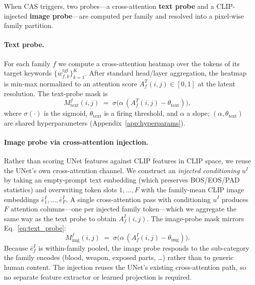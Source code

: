 When CAS triggers, two probes---a cross-attention \textbf{text probe} and a CLIP-injected \textbf{image probe}---are computed per family and resolved into a pixel-wise family partition.

\paragraph{Text probe.}
For each family $f$ we compute a cross-attention heatmap over the tokens of its target keywords $\{w^{\text{tgt}}_{f,k}\}_{k=1}^{K}$. After standard head/layer aggregation, the heatmap is min-max normalized to an attention score $A^{T}_f(i,j) \in [0,1]$ at the latent resolution. The text-probe mask is
\begin{equation}
    M^{f}_{\text{text}}(i,j) \;=\; \sigma\!\big(\alpha\,(A^{T}_f(i,j) - \theta_{\text{text}})\big),
    \label{eq:text_probe}
\end{equation}
where $\sigma(\cdot)$ is the sigmoid, $\theta_{\text{text}}$ is a firing threshold, and $\alpha$ a slope; $(\alpha, \theta_{\text{text}})$ are shared hyperparameters (Appendix~\ref{app:hyperparams}).

\paragraph{Image probe via cross-attention injection.}
Rather than scoring UNet features against CLIP features in CLIP space, we reuse the UNet's own cross-attention channel. We construct an \emph{injected conditioning} $u^{I}$ by taking an empty-prompt text embedding (which preserves BOS/EOS/PAD statistics) and overwriting token slots $1, \dots, F$ with the family-mean CLIP image embeddings $\bar{e}^{I}_1, \dots, \bar{e}^{I}_F$. A single cross-attention pass with conditioning $u^{I}$ produces $F$ attention columns---one per injected family token---which we aggregate the same way as the text probe to obtain $A^{I}_f(i,j)$. The image-probe mask mirrors Eq.~\ref{eq:text_probe}:
\begin{equation}
    M^{f}_{\text{img}}(i,j) \;=\; \sigma\!\big(\alpha\,(A^{I}_f(i,j) - \theta_{\text{img}})\big).
    \label{eq:img_probe}
\end{equation}
Because $\bar{e}^{I}_f$ is within-family pooled, the image probe responds to the sub-category the family encodes (blood, weapon, exposed parts, \dots) rather than to generic human content. The injection reuses the UNet's existing cross-attention path, so no separate feature extractor or learned projection is required.


